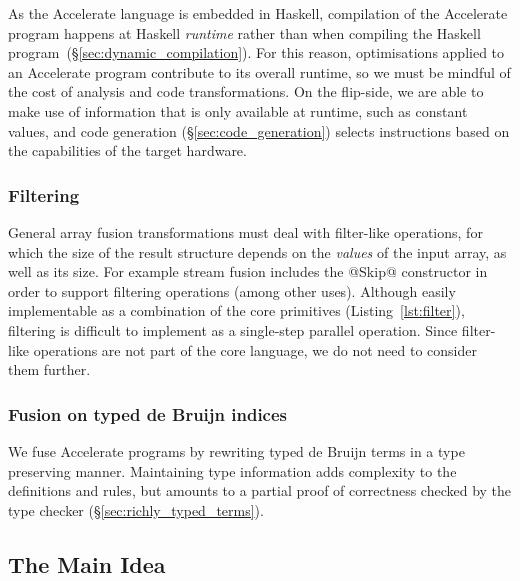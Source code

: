 As the Accelerate language is embedded in Haskell, compilation of the Accelerate
program happens at Haskell \emph{runtime} rather than when compiling the Haskell
program~(\S\ref{sec:dynamic_compilation}). For this reason, optimisations
applied to an Accelerate program contribute to its overall runtime, so we must
be mindful of the cost of analysis and code transformations. On the flip-side,
we are able to make use of information that is only available at runtime, such
as constant values, and code generation (\S\ref{sec:code_generation}) selects
instructions based on the capabilities of the target hardware.

\subsubsection{Filtering}

General array fusion transformations must deal with filter-like operations, for
which the size of the result structure depends on the \emph{values} of the input
array, as well as its size. For example stream fusion includes the @Skip@
constructor in order to support filtering operations (among other uses).
Although easily implementable as a combination of the core primitives
(Listing~\ref{lst:filter}), filtering is difficult to implement as a single-step
parallel operation. Since filter-like operations are not part of the core
language, we do not need to consider them further.


\subsubsection{Fusion on typed de Bruijn indices}

We fuse Accelerate programs by rewriting typed de Bruijn terms in a
type preserving manner. Maintaining type information adds complexity to the
definitions and rules, but amounts to a partial proof of correctness checked by
the type checker (\S\ref{sec:richly_typed_terms}).


\subsection{The Main Idea}
\label{sec:the_main_idea}


